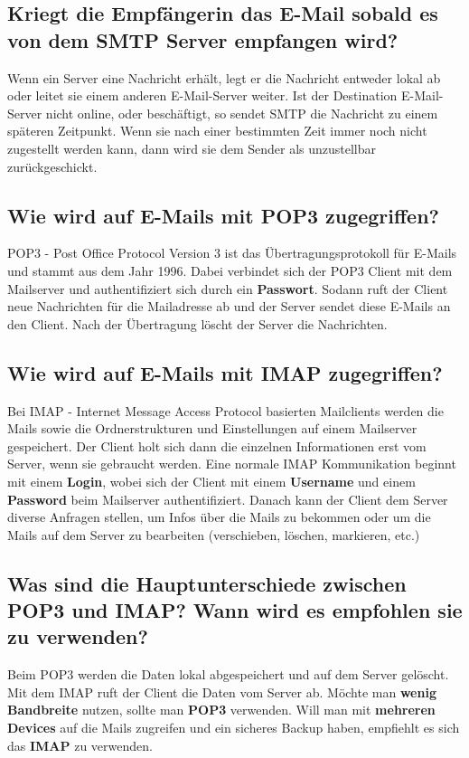\subsection*{Kriegt die Empfängerin das E-Mail sobald es von dem SMTP Server empfangen wird?}
Wenn ein Server eine Nachricht erhält, legt er die Nachricht entweder lokal ab oder leitet sie einem anderen E-Mail-Server weiter. Ist der Destination E-Mail-Server nicht online, oder beschäftigt, so sendet SMTP die Nachricht zu einem späteren Zeitpunkt. Wenn sie nach einer bestimmten Zeit immer noch nicht zugestellt werden kann, dann wird sie dem Sender als unzustellbar zurückgeschickt.

\subsection*{Wie wird auf E-Mails mit POP3 zugegriffen?}
POP3 - Post Office Protocol Version 3 ist das Übertragungsprotokoll für E-Mails und stammt aus dem Jahr 1996. Dabei verbindet sich der POP3 Client mit dem Mailserver und authentifiziert sich durch ein \textbf{Passwort}. Sodann ruft der Client neue Nachrichten für die Mailadresse ab und der Server sendet diese E-Mails an den Client. Nach der Übertragung löscht der Server die Nachrichten.

\subsection*{Wie wird auf E-Mails mit IMAP zugegriffen?}
Bei IMAP - Internet Message Access Protocol basierten Mailclients werden die Mails sowie die Ordnerstrukturen und Einstellungen auf einem Mailserver gespeichert. Der Client holt sich dann die einzelnen Informationen erst vom Server, wenn sie gebraucht werden. Eine normale IMAP Kommunikation beginnt mit einem \textbf{Login}, wobei sich der Client mit einem \textbf{Username} und einem \textbf{Password} beim Mailserver authentifiziert. Danach kann der Client dem Server diverse Anfragen stellen, um Infos über die Mails zu bekommen oder um die Mails auf dem Server zu bearbeiten (verschieben, löschen, markieren, etc.)

\subsection*{Was sind die Hauptunterschiede zwischen POP3 und IMAP? Wann wird es empfohlen sie zu verwenden? }
Beim POP3 werden die Daten lokal abgespeichert und auf dem Server gelöscht. Mit dem IMAP ruft der Client die Daten vom Server ab. Möchte man \textbf{wenig Bandbreite} nutzen, sollte man \textbf{POP3} verwenden. Will man mit \textbf{mehreren Devices} auf die Mails zugreifen und ein sicheres Backup haben, empfiehlt es sich das \textbf{IMAP} zu verwenden.

